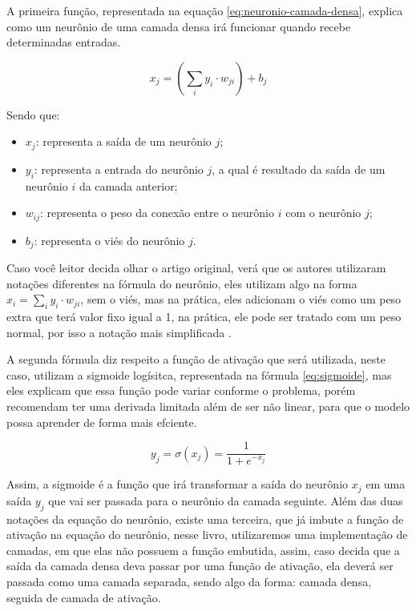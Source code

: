 A primeira função, representada na equação \ref{eq:neuronio-camada-densa}, explica como um neurônio de uma camada densa irá funcionar quando recebe determinadas entradas.

\begin{equation}
    x_j = (\sum_i y_i \cdot w_{ji}) + b_j
    \label{eq:neuronio-camada-densa}
\end{equation}

Sendo que:

\begin{itemize}
    \item $x_j$: representa a saída de um neurônio $j$;
    \item $y_i$: representa a entrada do neurônio $j$, a qual é resultado da saída de um neurônio $i$ da camada anterior;
    \item $w_{ij}$: representa o peso da conexão entre o neurônio $i$ com o neurônio $j$;
    \item $b_j$: representa o viés do neurônio $j$.
\end{itemize}

Caso você leitor decida olhar o artigo original, verá que os autores utilizaram notações diferentes na fórmula do neurônio, eles utilizam algo na forma $x_i = \sum_i y_i \cdot w_{ji}$, sem o viés, mas na prática, eles adicionam o viés como um peso extra que terá valor fixo igual a 1, na prática, ele pode ser tratado com um peso normal, por isso a notação mais simplificada \parencite{BackpropagationArticle}.

A segunda fórmula diz respeito a função de ativação que será utilizada, neste caso, \textcite{BackpropagationArticle} utilizam a sigmoide logísitca, representada na fórmula \ref{eq:sigmoide}, mas eles explicam que essa função pode variar conforme o problema, porém recomendam ter uma derivada limitada além de ser não linear, para que o modelo possa aprender de forma mais efciente.

\begin{equation}
    y_j = \sigma(x_j) = \frac{1}{1 + e^{-x_j}}
    \label{eq:sigmoide}
\end{equation}

Assim, a sigmoide é a função que irá transformar a saída do neurônio $x_j$ em uma saída $y_j$ que vai ser passada para o neurônio da camada seguinte. Além das duas notações da equação do neurônio, existe uma terceira, que já imbute a função de ativação na equação do neurônio, nesse livro, utilizaremos uma implementação de camadas, em que elas não possuem a função embutida, assim, caso decida que a saída da camada densa deva passar por uma função de ativação, ela deverá ser passada como uma camada separada, sendo algo da forma: camada densa, seguida de camada de ativação.

